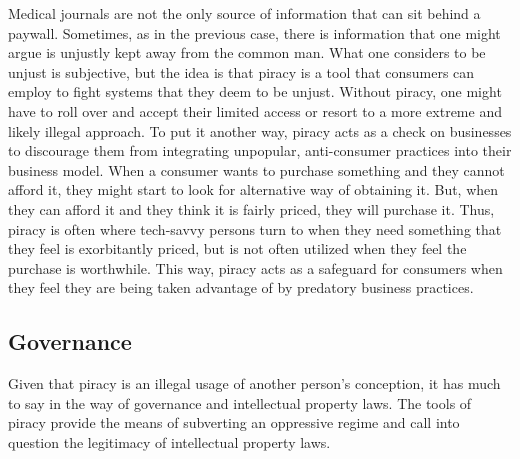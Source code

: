 \documentclass[onecolumn, 12pt]{article}
\begin{document}
Medical journals are not the only source of information that can sit behind a paywall.
Sometimes, as in the previous case, there is information that one might argue is unjustly
kept away from the common man. What one considers to be unjust is subjective, but the idea
is that piracy is a tool that consumers can employ to fight systems that they deem to be
unjust. Without piracy, one might have to roll over and accept their limited access or
resort to a more extreme and likely illegal approach. To put it another way, piracy acts
as a check on businesses to discourage them from integrating unpopular, anti-consumer
practices into their business model. When a consumer wants to purchase something and they
cannot afford it, they might start to look for alternative way of obtaining it. But, when
they can afford it and they think it is fairly priced, they will purchase it. Thus, piracy
is often where tech-savvy persons turn to when they need something that they feel is
exorbitantly priced, but is not often utilized when they feel the purchase is worthwhile.
This way, piracy acts as a safeguard for consumers when they feel they are being taken
advantage of by predatory business practices.

\subsection{Governance}
Given that piracy is an illegal usage of another person's conception, it has much to say
in the way of governance and intellectual property laws. The tools of piracy provide the
means of subverting an oppressive regime and call into question the legitimacy of
intellectual property laws.
\end{document}
